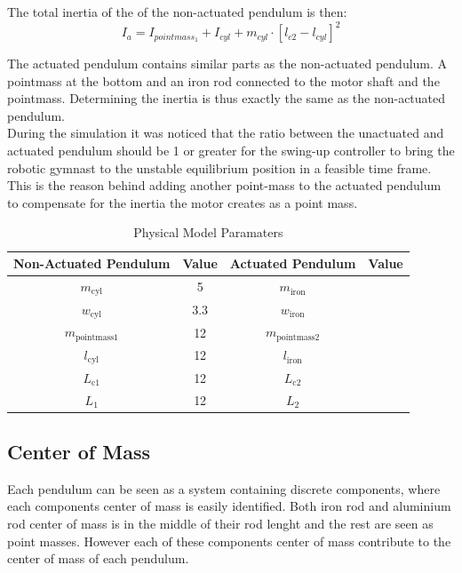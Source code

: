 The total inertia of the of the non-actuated pendulum is then: $$ I_{a} =I_{pointmass_1} +  I_{cyl} + m_{cyl}\cdot[l_{c2}-l_{cyl}]^2 $$

The actuated pendulum contains similar parts as the non-actuated pendulum. A pointmass at the bottom and an iron rod connected to the motor shaft and the pointmass. Determining the inertia is thus exactly the same as the non-actuated pendulum.\\

During the simulation it was noticed that the ratio between the unactuated and actuated pendulum should be 1 or greater for the swing-up controller to bring the robotic gymnast to the unstable equilibrium position in a feasible time frame. This is the reason behind adding another point-mass to the actuated pendulum to compensate for the inertia the motor creates as a point mass.


\begin{table}[]
	\centering
	\begin{tabular}{|c|c|c|c|}
		\hline
		Non-Actuated Pendulum& Value & Actuated Pendulum & Value \\
		\hline
		\hline
		$m_{\text{cyl}}$ & \SI{5}{} & $m_{\text{iron}}$ &\\
		\hline
		$w_{\text{cyl}}$ & \SI{3.3}{}& $w_{\text{iron}}$& \\
		\hline
		$m_{\text{pointmass1}}$ & \SI{12}{}& $m_{\text{pointmass2}}$& \\
		\hline
		$l_{\text{cyl}}$ & \SI{12}{}& $l_{\text{iron}}$& \\
		\hline
		$L_{\text{c1}}$ & \SI{12}{} & $L_{\text{c2}}$&\\
		\hline
		$L_{1}$ & \SI{12}{}& $L_{2}$& \\
		\hline
	\end{tabular}
	\caption{Physical Model Paramaters}
	\label{table:model_param}
\end{table}

\subsection{Center of Mass}
Each pendulum can be seen as a system containing discrete components, where each components center of mass is easily identified. Both iron rod and aluminium rod center of mass is in the middle of their rod lenght and the rest are seen as point masses. However each of these components center of mass contribute to the center of mass of each pendulum.\\

